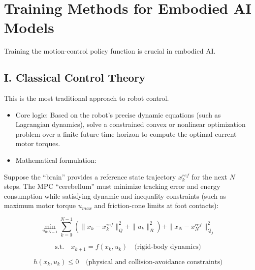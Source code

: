 \setcounter{section}{1}

\hypertarget{training-methods-for-embodied-ai-models}{%
\section{Training Methods for Embodied AI Models}\label{training-methods-for-embodied-ai-models}}

Training the motion-control policy function is crucial in embodied AI.

\hypertarget{i.-classical-control-theory}{%
\subsection{I. Classical Control Theory}\label{i.-classical-control-theory}}

This is the most traditional approach to robot control.

\begin{itemize}
\tightlist
\item
  Core logic: Based on the robot's precise dynamic equations (such as Lagrangian dynamics), solve a constrained convex or nonlinear optimization problem over a finite future time horizon to compute the optimal current motor torques.
\item
{}
  Mathematical formulation:
\end{itemize}

Suppose the ``brain'' provides a reference state trajectory \(x_k^{ref}\) for the next \(N\) steps. The MPC ``cerebellum'' must minimize tracking error and energy consumption while satisfying dynamic and inequality constraints (such as maximum motor torque \(u_{max}\) and friction-cone limits at foot contacts):

\[
\min_{u_{0:N-1}}
\sum_{k=0}^{N-1}
\left(
\|x_k-x_k^{ref}\|_Q^2+\|u_k\|_R^2
\right)
+
\|x_N-x_N^{ref}\|_{Q_f}^2
\]

\[
\text{s.t.}\quad x_{k+1}=f(x_k,u_k)\quad \text{(rigid-body dynamics)}
\]

\[
h(x_k,u_k)\le 0\quad \text{(physical and collision-avoidance constraints)}
\]

